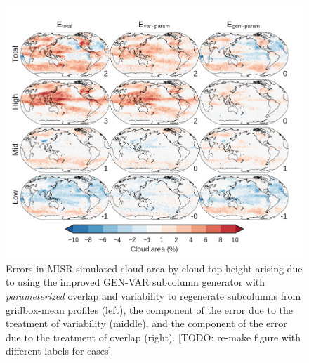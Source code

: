 \begin{figure}[htbp]
\centering
\includegraphics{graphics/subgrid2_cldmisr_maps_gen-var-param_diff.pdf}
\caption{\label{fig:cldmisrMapsParamDiff}Errors in MISR-simulated cloud
area by cloud top height arising due to using the improved GEN-VAR
subcolumn generator with \emph{parameterized} overlap and variability to
regenerate subcolumns from gridbox-mean profiles (left), the component
of the error due to the treatment of variability (middle), and the
component of the error due to the treatment of overlap (right). {[}TODO:
re-make figure with different labels for
cases{]}}\label{fig:cldmisrMapsParamDiff}
\end{figure}

